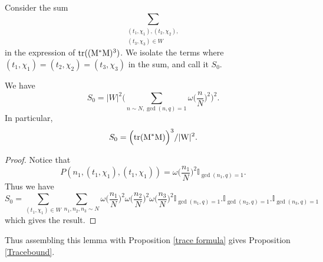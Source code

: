 Consider the sum \[\sum_{\substack{(t_1,\chi_1),(t_2,\chi_2),\\(t_3,\chi_3)\in W}}\]  in the expression of $\rm{tr}((M^*M)^3)$.
We isolate the terms where $(t_1,\chi_1)=(t_2,\chi_2)=(t_3,\chi_3)$ in the sum, and call it $S_0$.

\begin{lemma}
    We have \[
    S_0 = |W|^2\Bigg(\sum_{n\sim N, \gcd(n,q)=1} \omega\Big(\frac{n}{N}\Big)^2 \Bigg)^2.
    \]
    In particular, \[
    S_0 =  \Big(\rm{tr}(M^*M)\Big)^3/|W|^2.
    \]
\end{lemma}
\begin{proof}
    Notice that \[
    P(n_1,(t_1,\chi_1),(t_1,\chi_1)) = \omega\Big(\frac{n_1}{N}\Big)^2 \mathbb{I}_{\gcd(n_1,q)=1}.
    \]
    Thus we have \[
    S_0 = \sum_{(t_1,\chi_1)\in W} \sum_{n_1,n_2,n_3 \sim N}\omega\Big(\frac{n_1}{N}\Big)^2 \omega\Big(\frac{n_2}{N}\Big)^2 \omega\Big(\frac{n_3}{N}\Big)^2 \mathbb{I}_{\gcd(n_1,q)=1}.\mathbb{I}_{\gcd(n_2,q)=1}.\mathbb{I}_{\gcd(n_3,q)=1}
    \]
    which gives the result.
\end{proof}
Thus assembling this lemma with Proposition \ref{trace formula} gives Proposition \ref{Tracebound}.

